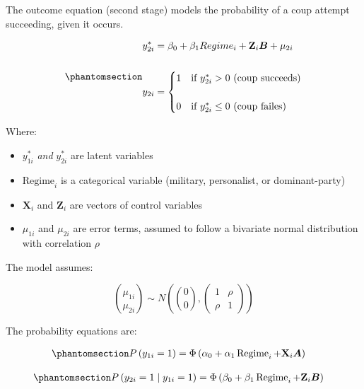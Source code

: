 \documentclass[
  12pt,
]{report}
\begin{document}
The outcome equation (second stage) models the probability of a coup
attempt succeeding, given it occurs.

\begin{equation}\phantomsection\label{eq-eq5}{
\begin{aligned}
y_{2i}^*&=\beta_0 + \beta_1 Regime_i + \mathbf{Z}_i \boldsymbol{B} + \mu_{2i}
\\
\\
y_{2i} &= 
\begin{cases} 
1 &\text{if $y_{2i}^*>0$ (coup succeeds)} \\
\\
0 &\text{if $y_{2i}^*\le0$ (coup failes)}
\end{cases}
\end{aligned}
}\end{equation}

Where:

\begin{itemize}
\item
  \(y_{1i}^*\) \emph{and} \(y_{2i}^*\) are latent variables
\item
  \(\text{Regime}_i\) is a categorical variable (military, personalist,
  or dominant-party)
\item
  \(\mathbf{X}_i\) and \(\mathbf{Z}_i\) are vectors of control variables
\item
  \(\mu_{1i}\) and \(\mu_{2i}\) are error terms, assumed to follow a
  bivariate normal distribution with correlation \(\rho\)
\end{itemize}

The model assumes:

\[
\binom{\mu_{1 i}}{\mu_{2 i}} \sim N\left(\binom{0}{0},\left(\begin{array}{ll}
1 & \rho \\
\rho & 1
\end{array}\right)\right)
\]

The probability equations are:

\begin{equation}\phantomsection\label{eq-eq7}{
\begin{aligned}
P\left(y_{1 i}=1\right) & =\Phi\left(\alpha_0+\alpha_1 \operatorname{Regime}_i+\mathbf{X}_i \boldsymbol{A}\right)
\end{aligned}
}\end{equation}

\begin{equation}\phantomsection\label{eq-eq8}{
\begin{aligned}
P\left(y_{2 i}=1 \mid y_{1 i}=1\right) & =\Phi\left(\beta_0+\beta_1 \operatorname{Regime}_i+\mathbf{Z}_i \boldsymbol{B}\right)
\end{aligned}
}\end{equation}
\end{document}
